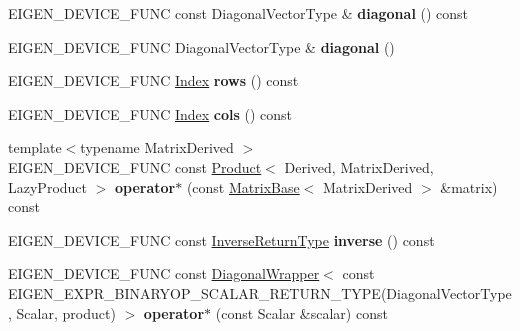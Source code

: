 \begin{DoxyCompactItemize}
E\+I\+G\+E\+N\+\_\+\+D\+E\+V\+I\+C\+E\+\_\+\+F\+U\+NC const Diagonal\+Vector\+Type \& {\bfseries diagonal} () const
\item 
\mbox{\label{class_eigen_1_1_diagonal_base_a094f1467bf3ebbbe0db30520275940f6}} 
E\+I\+G\+E\+N\+\_\+\+D\+E\+V\+I\+C\+E\+\_\+\+F\+U\+NC Diagonal\+Vector\+Type \& {\bfseries diagonal} ()
\item 
\mbox{\label{class_eigen_1_1_diagonal_base_a29c20477a3fc4092919fd3b0b28574f3}} 
E\+I\+G\+E\+N\+\_\+\+D\+E\+V\+I\+C\+E\+\_\+\+F\+U\+NC \hyperlink{group___core___module_a554f30542cc2316add4b1ea0a492ff02}{Index} {\bfseries rows} () const
\item 
\mbox{\label{class_eigen_1_1_diagonal_base_ab2f60c33e1a0024414d6bb129d34bb4b}} 
E\+I\+G\+E\+N\+\_\+\+D\+E\+V\+I\+C\+E\+\_\+\+F\+U\+NC \hyperlink{group___core___module_a554f30542cc2316add4b1ea0a492ff02}{Index} {\bfseries cols} () const
\item 
\mbox{\label{class_eigen_1_1_diagonal_base_a311acf89512b3aab2a846175f2e94456}} 
{\footnotesize template$<$typename Matrix\+Derived $>$ }\\E\+I\+G\+E\+N\+\_\+\+D\+E\+V\+I\+C\+E\+\_\+\+F\+U\+NC const \hyperlink{group___core___module_class_eigen_1_1_product}{Product}$<$ Derived, Matrix\+Derived, Lazy\+Product $>$ {\bfseries operator$\ast$} (const \hyperlink{group___core___module_class_eigen_1_1_matrix_base}{Matrix\+Base}$<$ Matrix\+Derived $>$ \&matrix) const
\item 
\mbox{\label{class_eigen_1_1_diagonal_base_a608e40d7fc3d4effb3851e77d76f586b}} 
E\+I\+G\+E\+N\+\_\+\+D\+E\+V\+I\+C\+E\+\_\+\+F\+U\+NC const \hyperlink{group___core___module_class_eigen_1_1_diagonal_wrapper}{Inverse\+Return\+Type} {\bfseries inverse} () const
\item 
\mbox{\label{class_eigen_1_1_diagonal_base_ae1b68e95250f656e9eb0ac746f8ba529}} 
E\+I\+G\+E\+N\+\_\+\+D\+E\+V\+I\+C\+E\+\_\+\+F\+U\+NC const \hyperlink{group___core___module_class_eigen_1_1_diagonal_wrapper}{Diagonal\+Wrapper}$<$ const E\+I\+G\+E\+N\+\_\+\+E\+X\+P\+R\+\_\+\+B\+I\+N\+A\+R\+Y\+O\+P\+\_\+\+S\+C\+A\+L\+A\+R\+\_\+\+R\+E\+T\+U\+R\+N\+\_\+\+T\+Y\+PE(Diagonal\+Vector\+Type, Scalar, product) $>$ {\bfseries operator$\ast$} (const Scalar \&scalar) const
\end{DoxyCompactItemize}
